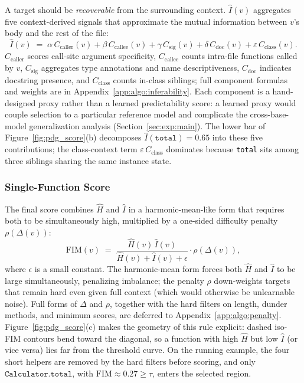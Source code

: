 A target should be \emph{recoverable} from the surrounding context.
$\hat{I}(v)$ aggregates five context-derived signals that approximate the
mutual information between $v$'s body and the rest of the file:
%
\begin{equation}
  \hat{I}(v) \;=\; \alpha\,C_{\mathrm{caller}}(v)
              + \beta\,C_{\mathrm{callee}}(v)
              + \gamma\,C_{\mathrm{sig}}(v)
              + \delta\,C_{\mathrm{doc}}(v)
              + \varepsilon\,C_{\mathrm{class}}(v).
  \label{eq:inferability}
\end{equation}
%
$C_{\mathrm{caller}}$ scores call-site argument specificity,
$C_{\mathrm{callee}}$ counts intra-file functions called by $v$,
$C_{\mathrm{sig}}$ aggregates type annotations and name descriptiveness,
$C_{\mathrm{doc}}$ indicates docstring presence, and
$C_{\mathrm{class}}$ counts in-class siblings; full component formulas
and weights are in Appendix~\ref{app:algo:inferability}. Each component
is a hand-designed proxy rather than a learned predictability score: a
learned proxy would couple selection to a particular reference model and
complicate the cross-base-model generalization analysis
(Section~\ref{sec:exp:main}). The lower bar of
Figure~\ref{fig:pdg_score}(b) decomposes
$\hat{I}(\texttt{total})\!=\!0.65$ into these five contributions; the
class-context term $\varepsilon\,C_{\mathrm{class}}$ dominates because
\texttt{total} sits among three siblings sharing the same instance state.

\subsubsection{Single-Function Score}
\label{sec:method:single}

The final score combines $\hat{H}$ and $\hat{I}$ in a harmonic-mean-like
form that requires both to be simultaneously high, multiplied by a
one-sided difficulty penalty $\rho(\Delta(v))$:
%
\begin{equation}
  \mathrm{FIM}(v) \;=\;
  \frac{\hat{H}(v)\,\hat{I}(v)}{\hat{H}(v) + \hat{I}(v) + \epsilon}
  \cdot \rho\!\left(\Delta(v)\right),
  \label{eq:fim_single}
\end{equation}
%
where $\epsilon$ is a small constant. The harmonic-mean form forces both
$\hat{H}$ and $\hat{I}$ to be large simultaneously, penalizing imbalance;
the penalty $\rho$ down-weights targets that remain hard even given full
context (which would otherwise be unlearnable noise). Full forms of
$\Delta$ and $\rho$, together with the hard filters on length, dunder
methods, and minimum scores, are deferred to
Appendix~\ref{app:algo:penalty}.
Figure~\ref{fig:pdg_score}(c) makes the geometry of this rule
explicit: dashed iso-FIM contours bend toward the diagonal, so a
function with high $\hat{H}$ but low $\hat{I}$ (or vice versa) lies far
from the threshold curve. On the running example, the four short
helpers are removed by the hard filters before scoring, and only
$\mathtt{Calculator.total}$, with
$\mathrm{FIM}\!\approx\!0.27\!\geq\!\tau$, enters the selected region.

